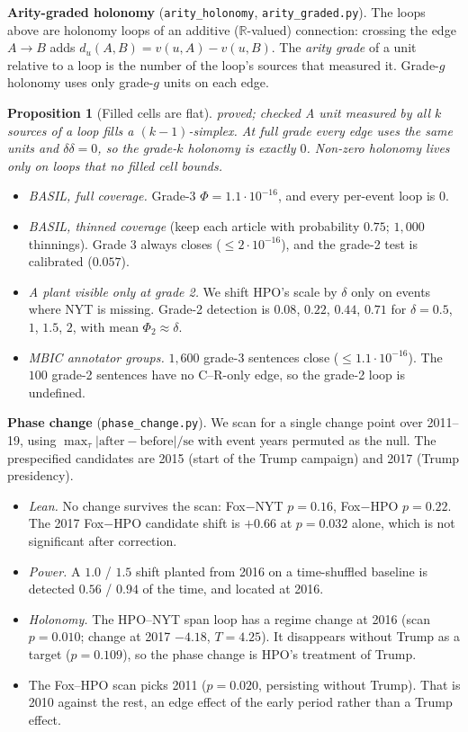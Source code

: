 \documentclass[11pt]{article}
\newtheorem{proposition}[theorem]{Proposition}
\theoremstyle{definition}
\theoremstyle{remark}
\newcommand{\R}{\mathbb{R}}
\newcommand{\st}[1]{\textsf{\small\color{gray}#1}}
\begin{document}
\textbf{Arity-graded holonomy} (\texttt{arity\_holonomy}, \texttt{arity\_graded.py}). The loops above are holonomy loops of an additive ($\R$-valued) connection: crossing the edge $A\to B$ adds $d_u(A,B)=v(u,A)-v(u,B)$. The \emph{arity grade} of a unit relative to a loop is the number of the loop's sources that measured it. Grade-$g$ holonomy uses only grade-$g$ units on each edge.
\begin{proposition}[Filled cells are flat]\label{prop:filled}\st{proved; checked}
A unit measured by all $k$ sources of a loop fills a $(k-1)$-simplex. At full grade every edge uses the same units and $\delta\delta=0$, so the grade-$k$ holonomy is exactly $0$. Non-zero holonomy lives only on loops that no filled cell bounds.
\end{proposition}
\begin{itemize}
  \item \emph{BASIL, full coverage.} Grade-3 $\Phi=1.1\cdot10^{-16}$, and every per-event loop is $0$.
  \item \emph{BASIL, thinned coverage} (keep each article with probability $0.75$; $1{,}000$ thinnings). Grade 3 always closes ($\le2\cdot10^{-16}$), and the grade-2 test is calibrated ($0.057$).
  \item \emph{A plant visible only at grade 2.} We shift HPO's scale by $\delta$ only on events where NYT is missing. Grade-2 detection is $0.08$, $0.22$, $0.44$, $0.71$ for $\delta=0.5$, $1$, $1.5$, $2$, with mean $\Phi_2\approx\delta$.
  \item \emph{MBIC annotator groups.} $1{,}600$ grade-3 sentences close ($\le1.1\cdot10^{-16}$). The $100$ grade-2 sentences have no C--R-only edge, so the grade-2 loop is undefined.
\end{itemize}

\textbf{Phase change} (\texttt{phase\_change.py}). We scan for a single change point over 2011--19, using $\max_\tau|\text{after}-\text{before}|/\text{se}$ with event years permuted as the null. The prespecified candidates are 2015 (start of the Trump campaign) and 2017 (Trump presidency).
\begin{itemize}
  \item \emph{Lean.} No change survives the scan: Fox$-$NYT $p=0.16$, Fox$-$HPO $p=0.22$. The 2017 Fox$-$HPO candidate shift is $+0.66$ at $p=0.032$ alone, which is not significant after correction.
  \item \emph{Power.} A $1.0$ / $1.5$ shift planted from 2016 on a time-shuffled baseline is detected $0.56$ / $0.94$ of the time, and located at 2016.
  \item \emph{Holonomy.} The HPO--NYT span loop has a regime change at 2016 (scan $p=0.010$; change at 2017 $-4.18$, $T=4.25$). It disappears without Trump as a target ($p=0.109$), so the phase change is HPO's treatment of Trump.
  \item The Fox--HPO scan picks 2011 ($p=0.020$, persisting without Trump). That is 2010 against the rest, an edge effect of the early period rather than a Trump effect.
\end{itemize}
\end{document}
